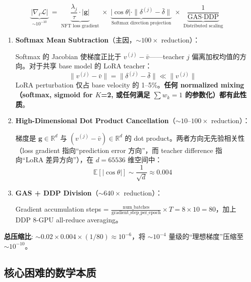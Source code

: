 \documentclass[11pt,a4paper]{article}
\newcommand{\loss}{\mathcal{L}}
\newcommand{\E}{\mathbb{E}}
\newcommand{\R}{\mathbb{R}}
\theoremstyle{definition}
\begin{document}
\begin{tcolorbox}[colback=red!5, colframe=red!60!black, title=梯度消失的三重因素]
\begin{equation}
\underbrace{|\nabla_\ell \loss|}_{\sim 10^{-10}} \;=\;
\underbrace{\frac{\lambda_j}{\tau} \cdot |\mathbf{g}|}_{\text{NFT loss gradient}} \;\times\;
\underbrace{|\cos\theta| \cdot \|\delta^{(j)} - \bar{\delta}\|}_{\text{Softmax direction projection}} \;\times\;
\underbrace{\frac{1}{\text{GAS} \cdot \text{DDP}}}_{\text{Distributed scaling}}
\end{equation}

\begin{enumerate}[leftmargin=1.5em]
\item \textbf{Softmax Mean Subtraction}（主因，$\sim 100\times$ reduction）：

Softmax 的 Jacobian 使梯度正比于 $v^{(j)} - \bar{v}$——teacher $j$ 偏离加权均值的方向。对于共享 base model 的 LoRA teacher：
\begin{equation}
\|v^{(j)} - \bar{v}\| = \|\delta^{(j)} - \bar{\delta}\| \ll \|v^{(j)}\|
\end{equation}
LoRA perturbation 仅占 base velocity 的 1--5\%。\textbf{任何 normalized mixing（softmax, sigmoid for $K$=2, 或任何满足 $\sum w_k = 1$ 的参数化）都有此性质}。

\item \textbf{High-Dimensional Dot Product Cancellation}（$\sim 10$--$100\times$ reduction）：

梯度是 $\mathbf{g} \in \R^d$ 与 $(v^{(j)} - \bar{v}) \in \R^d$ 的 dot product。两者方向无先验相关性（loss gradient 指向``prediction error 方向''，而 teacher difference 指向``LoRA 差异方向''），在 $d = 65536$ 维空间中：
\begin{equation}
\E[|\cos\theta|] \sim \frac{1}{\sqrt{d}} \approx 0.004
\end{equation}

\item \textbf{GAS + DDP Division}（$\sim 640\times$ reduction）：

Gradient accumulation steps = $\frac{\text{num\_batches}}{\text{gradient\_step\_per\_epoch}} \times T = 8 \times 10 = 80$，加上 DDP 8-GPU all-reduce averaging。
\end{enumerate}

\textbf{总压缩比}: $\sim 0.02 \times 0.004 \times (1/80) \approx 10^{-6}$，将 $\sim 10^{-4}$ 量级的``理想梯度''压缩至 $\sim 10^{-10}$。
\end{tcolorbox}

\subsection{核心困难的数学本质}
\end{document}
